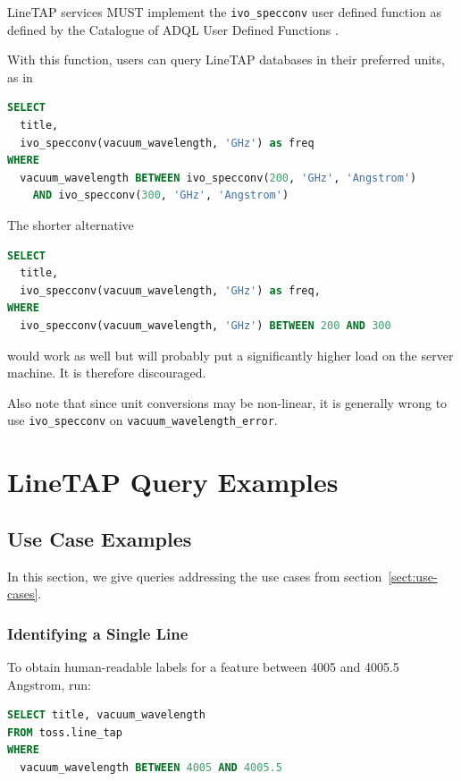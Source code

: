 \documentclass[11pt,a4paper]{ivoa}
\begin{document}
LineTAP services MUST implement the \texttt{ivo\_specconv} user defined
function as defined by the Catalogue of ADQL User Defined Functions
\citep{2021ivoa.spec.0310C}.

With this function, users can query LineTAP databases in their preferred
units, as in

\begin{lstlisting}[language=SQL]
SELECT
  title,
  ivo_specconv(vacuum_wavelength, 'GHz') as freq
WHERE
  vacuum_wavelength BETWEEN ivo_specconv(200, 'GHz', 'Angstrom')
    AND ivo_specconv(300, 'GHz', 'Angstrom')
\end{lstlisting}

The shorter alternative

\begin{lstlisting}[language=SQL]
SELECT
  title,
  ivo_specconv(vacuum_wavelength, 'GHz') as freq,
WHERE
  ivo_specconv(vacuum_wavelength, 'GHz') BETWEEN 200 AND 300
\end{lstlisting}

\noindent would work as well but will probably put a significantly higher load on
the server machine.  It is therefore discouraged.

Also note that since unit conversions may be non-linear, it is generally
wrong to use \texttt{ivo\_specconv} on
\texttt{vacuum\_wavelength\_error}.


\section{LineTAP Query Examples}

\subsection{Use Case Examples}

In this section, we give queries addressing the use cases from
section~\ref{sect:use-cases}.

\subsubsection{Identifying a Single Line}

To obtain human-readable labels for a feature between 4005 and 4005.5
Angstrom, run:

\begin{lstlisting}[language=SQL]
SELECT title, vacuum_wavelength
FROM toss.line_tap
WHERE
  vacuum_wavelength BETWEEN 4005 AND 4005.5
\end{lstlisting}
\end{document}
